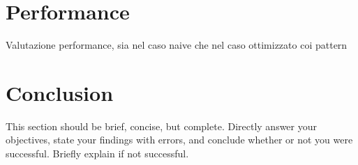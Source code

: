 \documentclass[runningheads]{llncs}
\begin{document}
\section{Performance}
Valutazione performance, sia nel caso naive che nel caso ottimizzato coi pattern

\section{Conclusion}
This section should be brief, concise, but complete. Directly answer your objectives, state your findings with errors, and conclude whether or not you were successful. Briefly explain if not successful.
\end{document}
